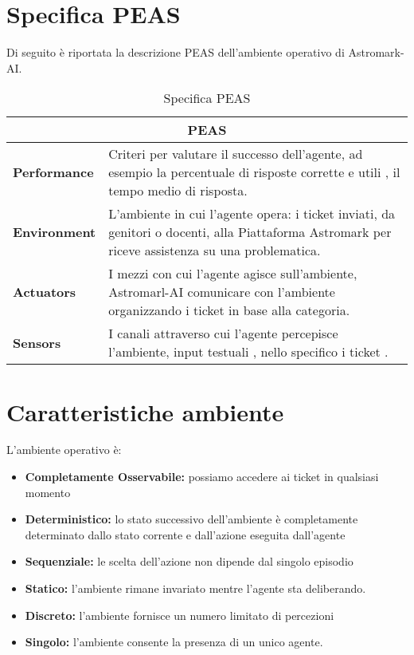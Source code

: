 \section{Specifica PEAS}
Di seguito è riportata la descrizione PEAS dell'ambiente operativo di Astromark-AI.
\begin{table}[h]
\centering
\begin{tabular}{|p{4cm}|p{10cm}|}
\hline
\multicolumn{2}{|c|}{\textbf{PEAS}} \\
\hline
\textbf{Performance} & Criteri per valutare il successo dell'agente, ad esempio la percentuale di risposte corrette e utili , il tempo medio di risposta. \\
\hline
\textbf{Environment} & L'ambiente in cui l'agente opera: i ticket inviati, da genitori o docenti, alla Piattaforma Astromark per riceve assistenza su una problematica. \\
\hline
\textbf{Actuators} & I mezzi con cui l'agente agisce sull'ambiente, Astromarl-AI comunicare con l'ambiente organizzando i ticket in base alla categoria. \\
\hline
\textbf{Sensors} & I canali attraverso cui l'agente percepisce l'ambiente, input testuali , nello specifico i ticket . \\
\hline
\end{tabular}
\caption{Specifica PEAS}
\label{tab:peas}
\end{table}

\FloatBarrier

\section{Caratteristiche ambiente}
L'ambiente operativo è:
\begin{itemize}
    \item \textbf{Completamente Osservabile: }possiamo accedere ai ticket in qualsiasi momento
    \item \textbf{Deterministico: }lo stato successivo dell’ambiente è completamente determinato dallo stato corrente e dall’azione eseguita dall’agente
    \item \textbf{Sequenziale: }le scelta dell'azione non dipende dal singolo episodio
    \item \textbf{Statico: }l'ambiente rimane invariato mentre l'agente sta deliberando.
    \item \textbf{Discreto: }l'ambiente fornisce un numero limitato di percezioni
    \item \textbf{Singolo: }l'ambiente consente la presenza di un unico agente.
\end{itemize}

